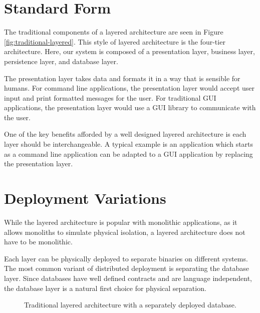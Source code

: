 \section{Standard Form}

The traditional components of a layered architecture are seen in Figure \ref{fig:traditional-layered}.
This style of layered architecture is the four-tier architecture.
Here, our system is composed of a presentation layer, business layer, persistence layer, and database layer.

The presentation layer takes data and formats it in a way that is sensible for humans.
For command line applications, the presentation layer would accept user input and print formatted messages for the user.
For traditional GUI applications, the presentation layer would use a GUI library to communicate with the user.


One of the key benefits afforded by a well designed layered architecture is each layer should be interchangeable.
A typical example is an application which starts as a command line application can be adapted to a GUI application by replacing the presentation layer.



\section{Deployment Variations}

While the layered architecture is popular with monolithic applications, as it allows monoliths to simulate physical isolation,
a layered architecture does not have to be monolithic.

Each layer can be physically deployed to separate binaries on different systems.
The most common variant of distributed deployment is separating the database layer.
Since databases have well defined contracts and are language independent, the database layer is a natural first choice for physical separation.

\begin{figure}[h]
    \centering
    \caption{Traditional layered architecture with a separately deployed database.}
    \label{fig:layered-db-separated}
\end{figure}

